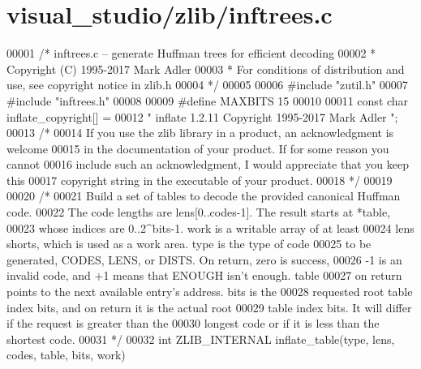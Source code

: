 \hypertarget{visual__studio_2zlib_2inftrees_8c_source}{}\section{visual\+\_\+studio/zlib/inftrees.c}
\label{visual__studio_2zlib_2inftrees_8c_source}

\begin{DoxyCode}
00001 \textcolor{comment}{/* inftrees.c -- generate Huffman trees for efficient decoding}
00002 \textcolor{comment}{ * Copyright (C) 1995-2017 Mark Adler}
00003 \textcolor{comment}{ * For conditions of distribution and use, see copyright notice in zlib.h}
00004 \textcolor{comment}{ */}
00005 
00006 \textcolor{preprocessor}{#include "zutil.h"}
00007 \textcolor{preprocessor}{#include "inftrees.h"}
00008 
00009 \textcolor{preprocessor}{#define MAXBITS 15}
00010 
00011 \textcolor{keyword}{const} \textcolor{keywordtype}{char} inflate\_copyright[] =
00012    \textcolor{stringliteral}{" inflate 1.2.11 Copyright 1995-2017 Mark Adler "};
00013 \textcolor{comment}{/*}
00014 \textcolor{comment}{  If you use the zlib library in a product, an acknowledgment is welcome}
00015 \textcolor{comment}{  in the documentation of your product. If for some reason you cannot}
00016 \textcolor{comment}{  include such an acknowledgment, I would appreciate that you keep this}
00017 \textcolor{comment}{  copyright string in the executable of your product.}
00018 \textcolor{comment}{ */}
00019 
00020 \textcolor{comment}{/*}
00021 \textcolor{comment}{   Build a set of tables to decode the provided canonical Huffman code.}
00022 \textcolor{comment}{   The code lengths are lens[0..codes-1].  The result starts at *table,}
00023 \textcolor{comment}{   whose indices are 0..2^bits-1.  work is a writable array of at least}
00024 \textcolor{comment}{   lens shorts, which is used as a work area.  type is the type of code}
00025 \textcolor{comment}{   to be generated, CODES, LENS, or DISTS.  On return, zero is success,}
00026 \textcolor{comment}{   -1 is an invalid code, and +1 means that ENOUGH isn't enough.  table}
00027 \textcolor{comment}{   on return points to the next available entry's address.  bits is the}
00028 \textcolor{comment}{   requested root table index bits, and on return it is the actual root}
00029 \textcolor{comment}{   table index bits.  It will differ if the request is greater than the}
00030 \textcolor{comment}{   longest code or if it is less than the shortest code.}
00031 \textcolor{comment}{ */}
00032 \textcolor{keywordtype}{int} ZLIB\_INTERNAL inflate\_table(type, lens, codes, table, bits, work)

\end{DoxyCode}

